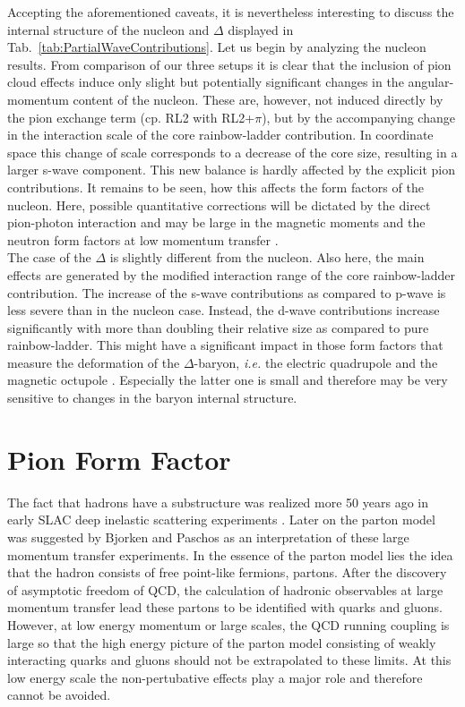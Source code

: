 Accepting the aforementioned caveats, it is nevertheless interesting to 
discuss the internal structure of the nucleon and $\Delta$ displayed in 
Tab.~\ref{tab:PartialWaveContributions}. Let us begin by analyzing 
the nucleon results. From comparison of our three setups it is clear 
that the inclusion of pion cloud effects induce only slight but potentially
significant changes in the angular-momentum content of the nucleon. These
are, however, not induced directly by the pion exchange term (cp. RL2 with
RL2+$\pi$), but by the accompanying change in the interaction scale of the
core rainbow-ladder contribution. In coordinate space this change of scale 
corresponds to a decrease of the core size, resulting in a larger s-wave 
component. This new balance is hardly affected by the explicit pion contributions.
It remains to be seen, how this affects the form factors of the nucleon.
Here, possible quantitative corrections will be dictated by the direct 
pion-photon interaction and may be large in the magnetic moments and the neutron
form factors at low momentum transfer \cite{Eichmann:2011vu}. \\

The case of the $\Delta$ is slightly different from the nucleon. Also here, the
main effects are generated by the modified interaction range of the core
rainbow-ladder contribution. The increase of the s-wave contributions as compared
to p-wave is less severe than in the nucleon case. Instead, the d-wave contributions
increase significantly with more than doubling their relative size as compared to
pure rainbow-ladder. This might have a significant impact in those form factors 
that measure the deformation of the $\Delta$-baryon, {\it i.e.} the electric quadrupole 
and the magnetic octupole \cite{Sanchis-Alepuz:2013iia}. Especially the latter 
one is small and therefore may be very sensitive to changes in the baryon internal 
structure.

\section{Pion Form Factor}
The fact that hadrons have a substructure was realized more 50 years ago in early SLAC deep inelastic scattering experiments \cite{9780471887416}. Later on the parton model was suggested by Bjorken and Paschos as an interpretation of these large momentum transfer experiments. In the essence of the parton model lies the idea that the hadron consists of free point-like fermions, partons. After the discovery of asymptotic freedom of QCD, the calculation of hadronic observables at large momentum transfer lead these partons to be identified with quarks and gluons. However, at low energy momentum or large scales, the QCD running coupling is large so that the high energy picture of the parton model consisting of weakly interacting quarks and gluons should not be extrapolated to these limits. At this low energy scale the non-pertubative effects play a major role and therefore cannot be avoided. 

